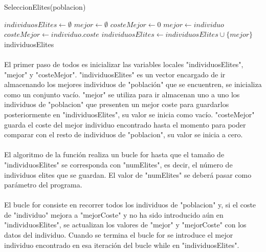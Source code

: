 	

	\begin{algorithm}[H]
		\caption{SeleccionElites(poblacion)}
		\begin{algorithmic}
			\STATE $individuosElites \leftarrow \emptyset$
			\STATE $mejor \leftarrow \emptyset$
			\STATE $costeMejor \leftarrow 0$
			\STATE $mejor \leftarrow individuo$
			\STATE $costeMejor \leftarrow individuo.coste$
			\ENDIF
			\ENDFOR
			\STATE $individuosElites \leftarrow individuosElites\cup\{mejor\}$
			\ENDWHILE
			\RETURN individuosElites
		\end{algorithmic}
	\end{algorithm}

	\paragraph{}El primer paso de todos es inicializar las variables locales "individuosElites", "mejor" y "costeMejor". "individuosElites" es un vector encargado de ir almacenando los mejores individuos de "población" que se encuentren, se inicializa como un conjunto vacío. "mejor" se utiliza para ir almacenan uno a uno los individuos de "poblacion" que presenten un mejor coste para guardarlos posteriormente en "individuosElites", su valor se inicia como vacío. "costeMejor" guarda el coste del mejor individuo encontrado hasta el momento para poder comparar con el resto de individuos de "poblacion", su valor se inicia a cero.
	
	\paragraph{}El algoritmo de la función realiza un bucle for hasta que el tamaño de "individuosElites" se corresponda con "numElites", es decir, el número de individuos elites que se guardan. El valor de "numElites" se deberá pasar como parámetro del programa.
	
	\paragraph{}El bucle for consiste en recorrer todos los individuos de "poblacion" y, si el coste de "individuo" mejora a "mejorCoste" y no ha sido introducido aún en "individuosElites", se actualizan los valores de "mejor" y "mejorCoste" con los datos del individuo. Cuando se termina el bucle for se introduce el mejor individuo encontrado en esa iteración del bucle while en "individuosElites".
	
